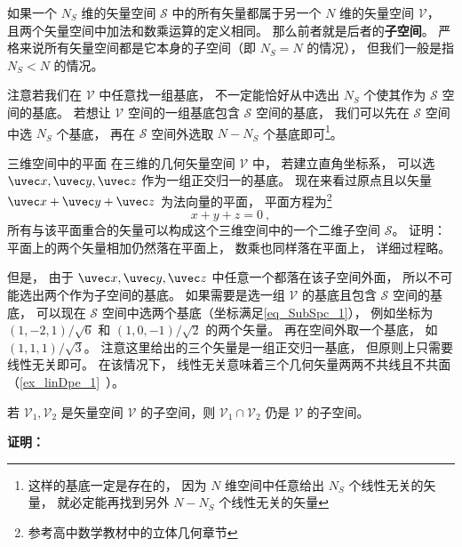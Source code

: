 
\begin{issues}
\issueDraft
\end{issues}



如果一个 $N_S$ 维的矢量空间 $\mathcal S$ 中的所有矢量都属于另一个 $N$ 维的矢量空间 $\mathcal V$， 且两个矢量空间中加法和数乘运算的定义相同。 那么前者就是后者的\textbf{子空间}。 严格来说所有矢量空间都是它本身的子空间（即 $N_S = N$ 的情况）， 但我们一般是指 $N_S < N$ 的情况。

注意若我们在 $\mathcal V$ 中任意找一组基底， 不一定能恰好从中选出 $N_S$ 个使其作为 $\mathcal S$ 空间的基底。 若想让 $\mathcal V$ 空间的一组基底包含 $\mathcal S$ 空间的基底， 我们可以先在 $\mathcal S$ 空间中选 $N_S$ 个基底， 再在 $\mathcal S$ 空间外选取 $N - N_S$ 个基底即可\footnote{这样的基底一定是存在的， 因为 $N$ 维空间中任意给出 $N_S$ 个线性无关的矢量， 就必定能再找到另外 $N - N_S$ 个线性无关的矢量}。

\begin{example}{三维空间中的平面}
在三维的几何矢量空间 $\mathcal V$ 中， 若建立直角坐标系， 可以选 $\uvec x, \uvec y, \uvec z$ 作为一组正交归一的基底。 现在来看过原点且以矢量 $\uvec x + \uvec y + \uvec z$ 为法向量的平面， 平面方程为\footnote{参考高中数学教材中的立体几何章节}
\begin{equation}\label{eq_SubSpc_1}
x + y + z = 0~,
\end{equation}
所有与该平面重合的矢量可以构成这个三维空间中的一个二维子空间 $\mathcal S$。 证明： 平面上的两个矢量相加仍然落在平面上， 数乘也同样落在平面上， 详细过程略。 

但是， 由于 $\uvec x, \uvec y, \uvec z$ 中任意一个都落在该子空间外面， 所以不可能选出两个作为子空间的基底。 如果需要是选一组 $\mathcal V$ 的基底且包含 $\mathcal S$ 空间的基底， 可以现在 $\mathcal S$ 空间中选两个基底（坐标满足\autoref{eq_SubSpc_1}）， 例如坐标为 $(1, -2, 1)/\sqrt{6}$ 和 $(1, 0, -1)/\sqrt{2}$ 的两个矢量。 再在空间外取一个基底， 如 $(1, 1, 1)/\sqrt{3}$。 注意这里给出的三个矢量是一组正交归一基底， 但原则上只需要线性无关即可。 在该情况下， 线性无关意味着三个几何矢量两两不共线且不共面（\autoref{ex_linDpe_1}~）。
\end{example}
\begin{theorem}{}\label{the_SubSpc_1}
若 $\mathcal V_1,\mathcal V_2$ 是矢量空间 $\mathcal V$ 的子空间，则 $\mathcal V_1\cap\mathcal V_2$ 仍是 $\mathcal V$ 的子空间。
\end{theorem}
\textbf{证明：}


